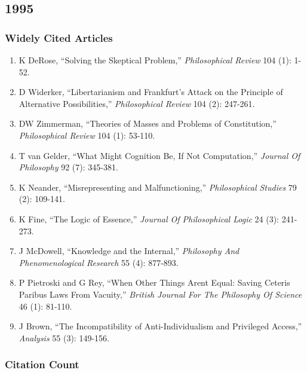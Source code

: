 \documentclass[
  10pt,
  letterpaper,
  DIV=11,
  numbers=noendperiod,
  twoside]{scrartcl}
\providecommand{\tightlist}{%
  \setlength{\itemsep}{0pt}\setlength{\parskip}{0pt}}\usepackage{longtable,booktabs,array}
\begin{document}
\newpage

\subsection{1995}\label{sec-s1995}

\subsubsection*{Widely Cited Articles}\label{widely-cited-articles-19}

\begin{enumerate}
\def\labelenumi{\arabic{enumi}.}
\tightlist
\item
  K DeRose, ``Solving the Skeptical Problem,'' \emph{Philosophical
  Review} 104 (1): 1-52.
\item
  D Widerker, ``Libertarianism and Frankfurt's Attack on the Principle
  of Alternative Possibilities,'' \emph{Philosophical Review} 104 (2):
  247-261.
\item
  DW Zimmerman, ``Theories of Masses and Problems of Constitution,''
  \emph{Philosophical Review} 104 (1): 53-110.
\item
  T van Gelder, ``What Might Cognition Be, If Not Computation,''
  \emph{Journal Of Philosophy} 92 (7): 345-381.
\item
  K Neander, ``Misrepresenting and Malfunctioning,'' \emph{Philosophical
  Studies} 79 (2): 109-141.
\item
  K Fine, ``The Logic of Essence,'' \emph{Journal Of Philosophical
  Logic} 24 (3): 241-273.
\item
  J McDowell, ``Knowledge and the Internal,'' \emph{Philosophy And
  Phenomenological Research} 55 (4): 877-893.
\item
  P Pietroski and G Rey, ``When Other Things Arent Equal: Saving Ceteris
  Paribus Laws From Vacuity,'' \emph{British Journal For The Philosophy
  Of Science} 46 (1): 81-110.
\item
  J Brown, ``The Incompatibility of Anti-Individualism and Privileged
  Access,'' \emph{Analysis} 55 (3): 149-156.
\end{enumerate}

\subsubsection*{Citation Count}\label{sec-count-1995}
\end{document}
